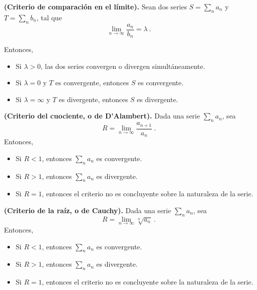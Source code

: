 \begin{teorema}{\textbf{(Criterio de comparación en el límite).}}
    Sean dos series $S = \sum\limits_n a_n$ y $T = \sum\limits_n b_n$, tal que 
    \begin{equation*}
        \lim_{n\to \infty} \frac{a_n}{b_n} = \lambda \ .
    \end{equation*}

    Entonces,
    \begin{itemize}
        \item Si $\lambda > 0$, las dos series convergen o divergen simultáneamente.
        \item Si $\lambda = 0$ y $T$ es convergente, entonces $S$ es convergente.
        \item Si $\lambda = \infty$ y $T$ es divergente, entonces $S$ es divergente.
    \end{itemize}
\end{teorema}



\begin{teorema}{\textbf{(Criterio del cuociente, o de D'Alambert).}}
    Dada una serie $\sum\limits_n a_n$, sea
    \begin{equation}
        R = \lim_{n \to \infty} \frac{a_{n+1}}{a_n} \ .
    \end{equation}
    Entonces,
    \begin{itemize}
        \item Si $R < 1$, entonces $\sum\limits_n a_n$ es convergente.
        \item Si $R > 1$, entonces $\sum\limits_n a_n$ es divergente.
        \item Si $R = 1$, entonces el criterio no es concluyente sobre la naturaleza de la serie.
    \end{itemize}
\end{teorema}


\begin{teorema}{\textbf{(Criterio de la raíz, o de Cauchy).}}
    Dada una serie $\sum\limits_n a_n$, sea
    \begin{equation}
        R = \lim_{n \to \infty} \sqrt[n]{a_n} \ .
    \end{equation}
    Entonces,
    \begin{itemize}
        \item Si $R < 1$, entonces $\sum\limits_n a_n$ es convergente.
        \item Si $R > 1$, entonces $\sum\limits_n a_n$ es divergente.
        \item Si $R = 1$, entonces el criterio no es concluyente sobre la naturaleza de la serie.
    \end{itemize}
\end{teorema}

